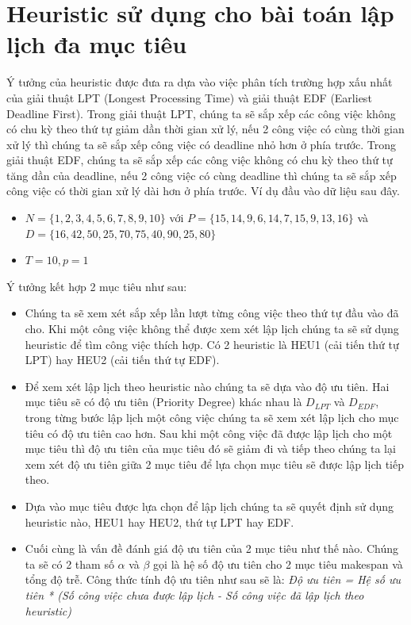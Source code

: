 \documentclass[a4paper,12pt]{article}
\begin{document}
\section{Heuristic sử dụng cho bài toán lập lịch đa mục tiêu}
Ý tưởng của heuristic được đưa ra dựa vào việc phân tích trường hợp xấu nhất của giải thuật LPT (Longest Processing Time) và giải thuật EDF (Earliest Deadline First). Trong giải thuật LPT, chúng ta sẽ sắp xếp các công việc không có chu kỳ theo thứ tự giảm dần thời gian xử lý, nếu 2 công việc có cùng thời gian xử lý thì chúng ta sẽ sắp xếp công việc có deadline nhỏ hơn ở phía trước. Trong giải thuật EDF, chúng ta sẽ sắp xếp các công việc không có chu kỳ theo thứ tự tăng dần của deadline, nếu 2 công việc có cùng deadline thì chúng ta sẽ sắp xếp công việc có thời gian xử lý dài hơn ở phía trước. Ví dụ đầu vào dữ liệu sau đây.
\begin{itemize}
\item
$N = \{1, 2, 3, 4, 5, 6, 7, 8, 9, 10\}$ với $P = \{15, 14, 9, 6, 14, 7, 15, 9, 13, 16\}$ và\\ $D = \{16, 42, 50, 25, 70, 75, 40, 90, 25, 80\}$
\item
$T = 10, p = 1$
\end{itemize}
Ý tưởng kết hợp 2 mục tiêu như sau:
\begin{itemize}
\item
Chúng ta sẽ xem xét sắp xếp lần lượt từng công việc theo thứ tự đầu vào đã cho. Khi một công việc không thể được xem xét lập lịch chúng ta sẽ sử dụng heuristic để tìm công việc thích hợp. Có 2 heuristic là HEU1 (cải tiến thứ tự LPT) hay HEU2 (cải tiến thứ tự EDF).
\item
Để xem xét lập lịch theo heuristic nào chúng ta sẽ dựa vào độ ưu tiên. Hai mục tiêu sẽ có độ ưu tiên (Priority Degree) khác nhau là $D_{LPT}$ và $D_{EDF}$, trong từng bước lập lịch một công việc chúng ta sẽ xem xét lập lịch cho mục tiêu có độ ưu tiên cao hơn. Sau khi một công việc đã được lập lịch cho một mục tiêu thì độ ưu tiên của mục tiêu đó sẽ giảm đi và tiếp theo chúng ta lại xem xét độ ưu tiên giữa 2 mục tiêu để lựa chọn mục tiêu sẽ được lập lịch tiếp theo.
\item
Dựa vào mục tiêu được lựa chọn để lập lịch chúng ta sẽ quyết định sử dụng heuristic nào, HEU1 hay HEU2, thứ tự LPT hay EDF. 
\item
Cuối cùng là vấn đề đánh giá độ ưu tiên của 2 mục tiêu như thế nào. Chúng ta sẽ có 2 tham số $\alpha$ và $\beta$ gọi là hệ số độ ưu tiên cho 2 mục tiêu makespan và tổng độ trễ. Công thức tính độ ưu tiên như sau sẽ là:\textit{ Độ ưu tiên = Hệ số ưu tiên * (Số công việc chưa được lập lịch - Số công việc đã lập lịch theo heuristic)}
\end{itemize}
\end{document}
